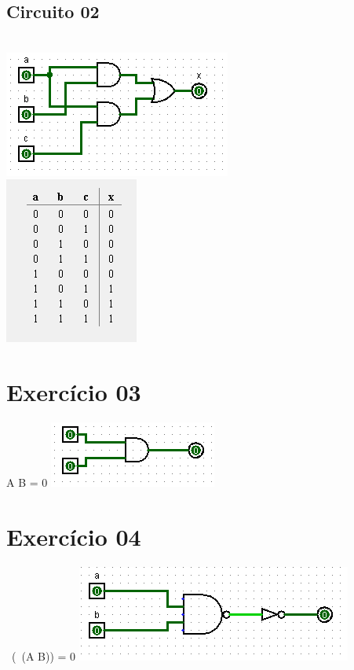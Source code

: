 \documentclass[12pt]{article}
\begin{document}
\subsection{Circuito 02}
\\\includegraphics{./images/exercicio02_circuito01.png}
\\\includegraphics{./images/exercicio02_circuito01_table.png}

\section{Exercício 03}
A B = 0
\includegraphics{./images/exercicio03_circuito.png}

\section{Exercício 04}
~(~(A B)) = 0
\includegraphics{./images/exercicio04_circuito.png}
\end{document}
